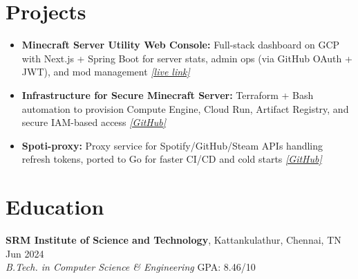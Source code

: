 \documentclass[12pt]{article}       %
\begin{document}

\section*{Projects}
\begin{itemize}
  \item \textbf{Minecraft Server Utility Web Console:} Full-stack dashboard on GCP with Next.js + Spring Boot for server stats, admin ops (via GitHub OAuth + JWT), and mod management \href{https://mccon.arhm.dev}{\textit{[live link]}}
  \item \textbf{Infrastructure for Secure Minecraft Server:} Terraform + Bash automation to provision Compute Engine, Cloud Run, Artifact Registry, and secure IAM-based access \href{https://github.com/apparentlyarhm/minecraft-terraform}{\textit{[GitHub]}}
  \item \textbf{Spoti-proxy:} Proxy service for Spotify/GitHub/Steam APIs handling refresh tokens, ported to Go for faster CI/CD and cold starts \href{https://github.com/apparentlyarhm/spotify-proxy}{\textit{[GitHub]}}
\end{itemize}


\vspace{-18.5pt}

\section*{Education}
\textbf{SRM Institute of Science and Technology}, Kattankulathur, Chennai, TN \hfill Jun 2024 \\
\textit{B.Tech. in Computer Science \& Engineering} \hfill GPA: 8.46/10
\end{document}
